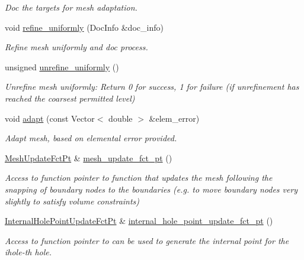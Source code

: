 \begin{DoxyCompactItemize}
\begin{DoxyCompactList}\small\item\em Doc the targets for mesh adaptation. \end{DoxyCompactList}\item 
void \hyperlink{classoomph_1_1RefineableTriangleMesh_a4820744f95d69328dfa4185fff21dd7b}{refine\+\_\+uniformly} (Doc\+Info \&doc\+\_\+info)
\begin{DoxyCompactList}\small\item\em Refine mesh uniformly and doc process. \end{DoxyCompactList}\item 
unsigned \hyperlink{classoomph_1_1RefineableTriangleMesh_ae52c6aea299625c683522f00a89ff33d}{unrefine\+\_\+uniformly} ()
\begin{DoxyCompactList}\small\item\em Unrefine mesh uniformly\+: Return 0 for success, 1 for failure (if unrefinement has reached the coarsest permitted level) \end{DoxyCompactList}\item 
void \hyperlink{classoomph_1_1RefineableTriangleMesh_affc156d32aa40f84479e223f1217ebed}{adapt} (const Vector$<$ double $>$ \&elem\+\_\+error)
\begin{DoxyCompactList}\small\item\em Adapt mesh, based on elemental error provided. \end{DoxyCompactList}\item 
\hyperlink{classoomph_1_1RefineableTriangleMesh_aa78ffa56b66a1371aec25e25f7aaff9e}{Mesh\+Update\+Fct\+Pt} \& \hyperlink{classoomph_1_1RefineableTriangleMesh_a09e932b9b9b3a42616524dd3fcb35fd3}{mesh\+\_\+update\+\_\+fct\+\_\+pt} ()
\begin{DoxyCompactList}\small\item\em Access to function pointer to function that updates the mesh following the snapping of boundary nodes to the boundaries (e.\+g. to move boundary nodes very slightly to satisfy volume constraints) \end{DoxyCompactList}\item 
\hyperlink{classoomph_1_1RefineableTriangleMesh_aa6831f42aa1941f4ae0b9186d01f9d7c}{Internal\+Hole\+Point\+Update\+Fct\+Pt} \& \hyperlink{classoomph_1_1RefineableTriangleMesh_af6e60e92bff82e8bf26ffd170125559c}{internal\+\_\+hole\+\_\+point\+\_\+update\+\_\+fct\+\_\+pt} ()
\begin{DoxyCompactList}\small\item\em Access to function pointer to can be used to generate the internal point for the ihole-\/th hole. \end{DoxyCompactList}\item 

\end{DoxyCompactItemize}

